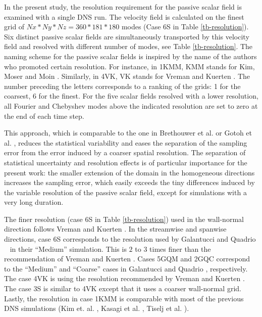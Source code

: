 \documentclass[review]{elsarticle}
\newcommand{\gqcite}{Galantucci and Quadrio \cite{galantucci2010very}}
\begin{document}
In the present study, the resolution requirement for the passive scalar field is examined with a single DNS run. The velocity field is calculated on the finest grid of $Nx*Ny*Nz = 360*181*180$ modes (Case 6S in Table \ref{tb-resolution}). Six distinct passive scalar fields are {\color{red}simultaneously} transported by this velocity field and resolved with different number of modes, see Table \ref{tb-resolution}. {\color{red} The naming scheme for the passive scalar fields is inspired by the name of the authors who promoted certain resolution. For instance, in 1KMM, KMM stands for Kim, Moser and Moin \cite{kim1987turbulence}. Similarly, in 4VK, VK stands for Vreman and Kuerten \citep{vreman2014comparison}. The number preceding the letters corresponds to a ranking of the grids: 1 for the coarsest, 6 for the finest.} For the five scalar fields resolved with a lower resolution, all Fourier and Chebyshev modes above the indicated resolution are set to zero at the end of each time step.

This approach, {\color{red}which is comparable to the one in Brethouwer et al. \cite{brethouwer2003micro} or Gotoh et al. \cite{gotoh2012spectral}},  reduces the statistical variability and eases the separation of the sampling error from the error induced by a coarser spatial resolution. The separation of statistical uncertainty and resolution effects is of particular importance for the present work: the smaller extension of the domain in the homogeneous directions increases the sampling error, which easily exceeds the tiny differences induced by the variable resolution of the passive scalar field, except for simulations with a very long duration.

The finer resolution (case 6S in Table \ref{tb-resolution}) used in the wall-normal direction follows Vreman and Kuerten \cite{vreman2014comparison}. In the streamwise and spanwise directions, case 6S corresponds to the resolution used by \gqcite ~ in their ``Medium'' simulation. This is $2$ to $3$ times finer than the recommendation of Vreman and Kuerten \cite{vreman2014comparison}. Cases 5GQM and 2GQC correspond to the ``Medium'' and ``Coarse'' cases in \gqcite, respectively. The case 4VK is using the resolution recommended by Vreman and Kuerten \cite{vreman2014comparison}. The case 3S is similar to 4VK except that it uses a coarser wall-normal grid. Lastly, the resolution in case 1KMM is comparable with most of the previous DNS simulations (Kim et. al. \cite{kim1987turbulence}, Kasagi et al. \cite{kasagi1991direct}, Tiselj et al. \cite{tiselj2001effect}).
\end{document}
